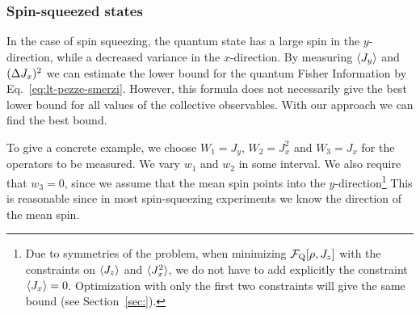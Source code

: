 \subsubsection{Spin-squeezed states}

In the case of spin squeezing, the quantum state has a large spin in the $y$-direction, while a decreased variance in the $x$-direction.
By measuring $\langle J_y \rangle$ and $(\Delta J_x )^2$ we can estimate the lower bound for the quantum Fisher Information by Eq.~\eqref{eq:lt-pezze-smerzi}.
However, this formula does not necessarily give the best lower bound for all values of the collective observables.
With our approach we can find the best bound.

To give a concrete example, we choose $W_1=J_y$, $W_2=J_x^2$ and $W_3=J_x$ for the operators to be measured.
We vary $w_1$ and $w_2$ in some interval.
We also require that $w_3=0$, since we assume that the mean spin points into the $y$-direction\footnote{
Due to symmetries of the problem, when minimizing $\mathcal{F}_{\textnormal{Q}}[\rho,J_z]$ with the constraints on $\langle J_z \rangle$ and $\langle J_x^2 \rangle$, we do not have to add explicitly the constraint $\langle J_x \rangle=0$.
Optimization with only the first two constraints will give the same bound (see Section~\ref{sec:}).}
This is reasonable since in most spin-squeezing experiments we know the direction of the mean spin.

